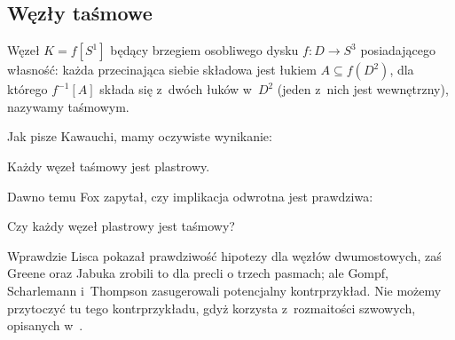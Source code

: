 
\subsection{Węzły taśmowe}
%

\begin{definition}
    Węzeł $K = f[S^1]$ będący brzegiem osobliwego dysku $f \colon D \to S^3$ posiadającego  własność: każda przecinająca siebie składowa jest łukiem $A \subseteq f(D^2)$, dla którego $f^{-1}[A]$ składa się z~dwóch łuków w~$D^2$ (jeden z~nich jest wewnętrzny), nazywamy taśmowym.
\end{definition}

Jak pisze Kawauchi, mamy oczywiste wynikanie:

\begin{proposition}
    Każdy węzeł taśmowy jest plastrowy.
%
\end{proposition}

Dawno temu Fox \cite[problem 1.33]{kirby1978} zapytał, czy implikacja odwrotna jest prawdziwa:
%

\begin{conjecture}
    Czy każdy węzeł plastrowy jest taśmowy?
\end{conjecture}

Wprawdzie Lisca \cite{lisca2007} pokazał prawdziwość hipotezy dla węzłów dwumostowych,
%
%
zaś Greene oraz Jabuka \cite{greene2011} zrobili to dla precli o trzech pasmach;
%
%
%
ale Gompf, Scharlemann i~Thompson \cite{gompf2010} zasugerowali potencjalny kontrprzykład.
%
%
%
Nie możemy przytoczyć tu tego kontrprzykładu, gdyż korzysta z~rozmaitości szwowych, opisanych w~\cite[s. 53-59]{kawauchi1996}.
%


